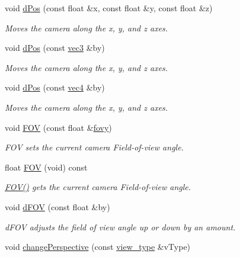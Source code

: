 \begin{DoxyCompactItemize}
void \hyperlink{class_camera_a2ac5f89b4f9f012dead66980925143c0}{d\-Pos} (const float \&x, const float \&y, const float \&z)
\begin{DoxyCompactList}\small\item\em Moves the camera along the x, y, and z axes. \end{DoxyCompactList}\item 
void \hyperlink{class_camera_a928de59670f0b31264307a8a0888b99d}{d\-Pos} (const \hyperlink{struct_angel_1_1vec3}{vec3} \&by)
\begin{DoxyCompactList}\small\item\em Moves the camera along the x, y, and z axes. \end{DoxyCompactList}\item 
void \hyperlink{class_camera_a4ec2e3d2a66826aedb1ac1eee7da0b96}{d\-Pos} (const \hyperlink{struct_angel_1_1vec4}{vec4} \&by)
\begin{DoxyCompactList}\small\item\em Moves the camera along the x, y, and z axes. \end{DoxyCompactList}\item 
void \hyperlink{class_camera_ac325bf616014d2e6023b84b6224630ac}{F\-O\-V} (const float \&\hyperlink{class_camera_acc8b97facc57059530efad534c2f8314}{fovy})
\begin{DoxyCompactList}\small\item\em F\-O\-V sets the current camera Field-\/of-\/view angle. \end{DoxyCompactList}\item 
float \hyperlink{class_camera_a8817ea073431268d8c0e522cdc30026c}{F\-O\-V} (void) const 
\begin{DoxyCompactList}\small\item\em \hyperlink{class_camera_a8817ea073431268d8c0e522cdc30026c}{F\-O\-V()} gets the current camera Field-\/of-\/view angle. \end{DoxyCompactList}\item 
void \hyperlink{class_camera_a55355b3376d195b17adcc6a5b72ae07b}{d\-F\-O\-V} (const float \&by)
\begin{DoxyCompactList}\small\item\em d\-F\-O\-V adjusts the field of view angle up or down by an amount. \end{DoxyCompactList}\item 
void \hyperlink{class_camera_aaadaebb40dc7262abc3f4bc52bc5bfb3}{change\-Perspective} (const \hyperlink{class_camera_afdccec6d447490dcc80ab6b99f21d0e5}{view\-\_\-type} \&v\-Type)

\end{DoxyCompactItemize}

